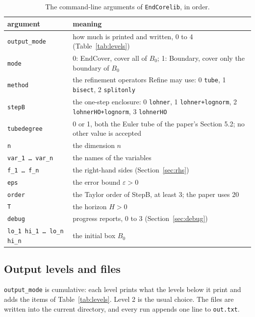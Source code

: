 \documentclass[11pt,a4paper]{article}
\newcommand{\file}[1]{\nolinkurl{#1}}
\newcommand{\eps}{\varepsilon}
\begin{document}
\begin{table}[htb]
\centering\small
\caption{The command-line arguments of \texttt{EndCorelib}, in order.}
\label{tab:args}
\begin{tabular}{lp{}}
\toprule
argument & meaning \\
\midrule
\texttt{output\_mode} & how much is printed and written, 0 to 4
                        (Table~\ref{tab:levels}) \\
\texttt{mode}         & 0: EndCover, cover all of $B_0$; 1: Boundary, cover
                        only the boundary of $B_0$ \\
\texttt{method}       & the refinement operators Refine may use: 0
                        \texttt{tube}, 1 \texttt{bisect}, 2
                        \texttt{splitonly} \\
\texttt{stepB}        & the one-step enclosure: 0 \texttt{lohner}, 1
                        \texttt{lohner+lognorm}, 2 \texttt{lohnerHO+lognorm},
                        3 \texttt{lohnerHO} \\
\texttt{tubedegree}   & 0 or 1, both the Euler tube of the paper's
                        Section 5.2; no other value is accepted \\
\texttt{n}            & the dimension $n$ \\
\texttt{var\_1 \dots\ var\_n} & the names of the variables \\
\texttt{f\_1 \dots\ f\_n}     & the right-hand sides (Section~\ref{sec:rhs}) \\
\texttt{eps}          & the error bound $\eps > 0$ \\
\texttt{order}        & the Taylor order of StepB, at least 3; the paper
                        uses 20 \\
\texttt{T}            & the horizon $H > 0$ \\
\texttt{debug}        & progress reports, 0 to 3 (Section~\ref{sec:debug}) \\
\texttt{lo\_1 hi\_1 \dots\ lo\_n hi\_n} & the initial box $B_0$ \\
\bottomrule
\end{tabular}
\end{table}

\subsection{Output levels and files}

\texttt{output\_mode} is cumulative: each level prints what the levels below
it print and adds the items of Table~\ref{tab:levels}. Level 2 is the usual
choice. The files are written into the current directory, and every run
appends one line to \file{out.txt}.
\end{document}
